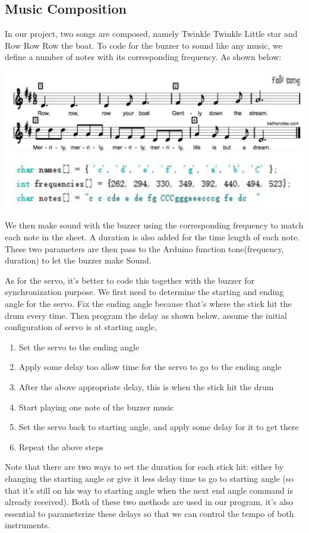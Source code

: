 \documentclass[a0,landscape]{a0poster}
\begin{document}
\begin{multicols}{4}
\color{DarkSlateGray} %

\section*{Music Composition}
In our project, two songs are composed, namely Twinkle Twinkle Little star and Row Row Row the boat. To code for the buzzer to sound like any music, we define a number of notes with its corresponding frequency. As shown below:
\begin{center}\vspace{1cm}
\includegraphics[width=0.8\linewidth]{compose}
\end{center}\vspace{1cm}
We then make sound with the buzzer using the corresponding frequency to match each note in the sheet. A duration is also added for the time length of each note. These two parameters are then pass to the Arduino function tone(frequency, duration) to let the buzzer make Sound. \par
As for the servo, it's better to code this together with the buzzer for synchronization purpose. We first need to determine the starting and ending angle for the servo. Fix the ending angle because that's where the stick hit the drum every time. Then program the delay as shown below, assume the initial configuration of servo is at starting angle,
\begin{enumerate}
\item Set the servo to the ending angle
\item Apply some delay too allow time for the servo to go to the ending angle
\item After the above appropriate delay, this is when the stick hit the drum
\item Start playing one note of the buzzer music
\item Set the servo back to starting angle, and apply some delay for it to get there
\item Repeat the above steps
\end{enumerate}
Note that there are two ways to set the duration for each stick hit: either by changing the starting angle or give it less delay time to go to starting angle (so that it's still on his way to starting angle when the next end angle command is already received). Both of these two methods are used in our program, it's also essential to parameterize these delays so that we can control the tempo of both instruments.


\end{multicols}
\end{document}

